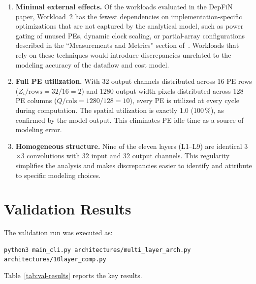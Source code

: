 \begin{enumerate}
  \item \textbf{Minimal external effects.}
        Of the workloads evaluated in the DepFiN paper, Workload~2 has
        the fewest dependencies on implementation-specific optimizations
        that are not captured by the analytical model, such as power
        gating of unused PEs, dynamic clock scaling, or partial-array
        configurations described in the ``Measurements and Metrics''
        section of~\cite{goetschalckx2023depfin}.
        Workloads that rely on these techniques would introduce
        discrepancies unrelated to the modeling accuracy of the
        dataflow and cost model.

  \item \textbf{Full PE utilization.}
        With 32 output channels distributed across 16 PE rows
        ($Z_i/\text{rows} = 32/16 = 2$) and 1280 output width pixels
        distributed across 128 PE columns
        ($Q/\text{cols} = 1280/128 = 10$), every PE is utilized at
        every cycle during computation.
        The spatial utilization is exactly 1.0 (100\,\%), as confirmed
        by the model output.
        This eliminates PE idle time as a source of modeling error.

  \item \textbf{Homogeneous structure.}
        Nine of the eleven layers (L1--L9) are identical
        3$\times$3 convolutions with 32 input and 32 output channels.
        This regularity simplifies the analysis and makes discrepancies
        easier to identify and attribute to specific modeling choices.
\end{enumerate}


\section{Validation Results}
\label{sec:val-results}

The validation run was executed as:
\begin{center}
\texttt{python3 main\_cli.py architectures/multi\_layer\_arch.py architectures/10layer\_comp.py}
\end{center}

\noindent Table~\ref{tab:val-results} reports the key results.

